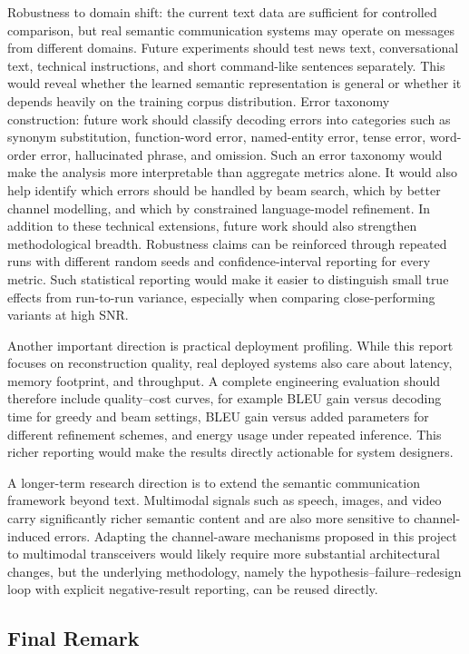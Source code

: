 Robustness to domain shift: the current text data are sufficient for controlled comparison, but real semantic communication systems may operate on messages from different domains. Future experiments should test news text, conversational text, technical instructions, and short command-like sentences separately. This would reveal whether the learned semantic representation is general or whether it depends heavily on the training corpus distribution.
Error taxonomy construction: future work should classify decoding errors into categories such as synonym substitution, function-word error, named-entity error, tense error, word-order error, hallucinated phrase, and omission. Such an error taxonomy would make the analysis more interpretable than aggregate metrics alone. It would also help identify which errors should be handled by beam search, which by better channel modelling, and which by constrained language-model refinement.
In addition to these technical extensions, future work should also strengthen methodological breadth. Robustness claims can be reinforced through repeated runs with different random seeds and confidence-interval reporting for every metric. Such statistical reporting would make it easier to distinguish small true effects from run-to-run variance, especially when comparing close-performing variants at high SNR.

Another important direction is practical deployment profiling. While this report focuses on reconstruction quality, real deployed systems also care about latency, memory footprint, and throughput. A complete engineering evaluation should therefore include quality--cost curves, for example BLEU gain versus decoding time for greedy and beam settings, BLEU gain versus added parameters for different refinement schemes, and energy usage under repeated inference. This richer reporting would make the results directly actionable for system designers.

A longer-term research direction is to extend the semantic communication framework beyond text. Multimodal signals such as speech, images, and video carry significantly richer semantic content and are also more sensitive to channel-induced errors. Adapting the channel-aware mechanisms proposed in this project to multimodal transceivers would likely require more substantial architectural changes, but the underlying methodology, namely the hypothesis--failure--redesign loop with explicit negative-result reporting, can be reused directly.

\subsection{Final Remark}

